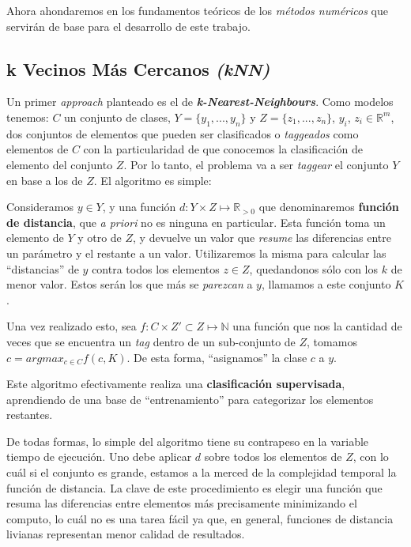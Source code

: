 Ahora ahondaremos en los fundamentos te\'oricos de los \textit{m\'etodos num\'ericos} que servir\'an de base para el desarrollo de este trabajo.

\subsection{k Vecinos M\'as Cercanos \textit{(kNN)}}

Un primer \textit{approach} planteado es el de \textit{\textbf{k-Nearest-Neighbours}}. Como modelos tenemos: $C$ un conjunto de clases, $Y = \{y_{1}, ..., y_{n}\}$ y $Z = \{z_{1}, ..., z_{n}\}$, $y_{i}$, $z_{i} \in \mathbb{R}^m$, dos conjuntos de elementos que pueden ser clasificados o \textit{taggeados} como elementos de $C$ con la particularidad de que conocemos la clasificaci\'on de elemento del conjunto $Z$. Por lo tanto, el problema va a ser \textit{taggear} el conjunto $Y$ en base a los de $Z$. El algoritmo es simple:

Consideramos $y \in Y$, y una funci\'on $d : Y \times Z \mapsto \mathbb{R}_{> 0}$ que denominaremos \textbf{funci\'on de distancia}, que \textit{a priori} no es ninguna en particular. Esta funci\'on toma un elemento de $Y$ y otro de $Z$, y devuelve un valor que \textit{resume} las diferencias entre un par\'ametro y el restante a un valor. Utilizaremos la misma para calcular las ``distancias'' de $y$ contra todos los elementos $z \in Z$, quedandonos s\'olo con los $k$ de menor valor. Estos ser\'an los que m\'as se \textit{parezcan} a $y$, llamamos a este conjunto $K$.

Una vez realizado esto, sea $f : C \times Z' \subset Z \mapsto \mathbb{N}$ una funci\'on que nos la cantidad de veces que se encuentra un \textit{tag} dentro de un sub-conjunto de $Z$, tomamos $c = argmax_{c \in C} f(c, K)$. De esta forma, ``asignamos'' la clase $c$ a $y$.

Este algoritmo efectivamente realiza una \textbf{clasificaci\'on supervisada}, aprendiendo de una base de ``entrenamiento'' para categorizar los elementos restantes.

De todas formas, lo simple del algoritmo tiene su contrapeso en la variable tiempo de ejecuci\'on. Uno debe aplicar $d$ sobre todos los elementos de $Z$, con lo cu\'al si el conjunto es grande, estamos a la merced de la complejidad temporal la funci\'on de distancia. La clave de este procedimiento es elegir una funci\'on que resuma las diferencias entre elementos m\'as precisamente minimizando el computo, lo cu\'al no es una tarea f\'acil ya que, en general, funciones de distancia livianas representan menor calidad de resultados.

